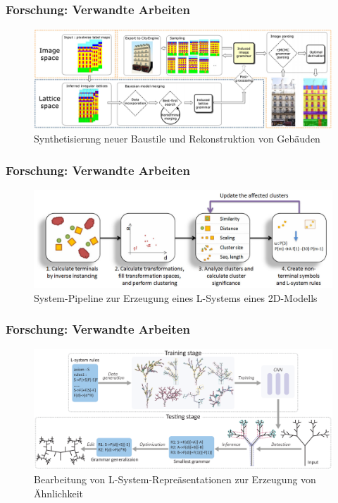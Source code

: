 \documentclass[12pt]{beamer}
\begin{document}
    \begin{frame}
        \frametitle{Forschung: Verwandte Arbeiten}

        \begin{figure}
            \centering
            \includegraphics[width=12cm]{../images/martinovic_2013_system.PNG}
            \caption{Synthetisierung neuer Baustile und Rekonstruktion von Gebäuden}
        \end{figure}
    \end{frame}

    \begin{frame}
        \frametitle{Forschung: Verwandte Arbeiten}

        \begin{figure}
            \centering
            \includegraphics[width=12cm]{../images/stava_2010_system.PNG}
            \caption{System-Pipeline zur Erzeugung eines L-Systems eines 2D-Modells}
        \end{figure}
    \end{frame}

    \begin{frame}
        \frametitle{Forschung: Verwandte Arbeiten}

        \begin{figure}
            \centering
            \includegraphics[width=12cm]{../images/guo_2020_system.PNG}
            \caption{Bearbeitung von L-System-Repreäsentationen zur Erzeugung von Ähnlichkeit}
        \end{figure}
    \end{frame}
\end{document}
